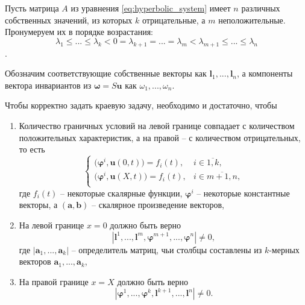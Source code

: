 \documentclass[../main.tex]{subfile}
\begin{document}
\begin{theorem}
	Пусть матрица $A$ из уравнения \eqref{eq:hyperbolic_system} имеет $n$
	различных собственных значений, из которых $k$ отрицательные, а $m$
	неположительные. Пронумеруем их в порядке возрастания:
	\[\lambda_1\le...\le\lambda_k<0=\lambda_{k+1}=...=\lambda_m<
	\lambda_{m+1}\le...\le\lambda_n\].

	Обозначим соответствующие собственные векторы как $\boldsymbol l_1,...,
	\boldsymbol l_n$,
	а компоненты вектора инвариантов из $\boldsymbol\omega=S\boldsymbol u$
	как $\omega_1,...,\omega_n$.

	Чтобы корректно задать краевую задачу, необходимо и достаточно, чтобы

	\begin{enumerate}[nosep]
		\item
			Количество граничных условий на левой границе совпадает с
			количеством положительных характеристик, а на правой --
			с количеством отрицательных, то есть
			\[
				\begin{cases}
					\big(\boldsymbol\varphi^i,
						\boldsymbol u(0,t)\big)=f_i(t),&
						i\in\overline{1,k}, \\
					\big(\boldsymbol\varphi^i,
						\boldsymbol u(X,t)\big)=f_i(t),&
						i\in\overline{m+1,n}, \\
				\end{cases}
			\]
			где $f_i(t)$ -- некоторые скалярные функции,
			$\boldsymbol\varphi^i$ -- некоторые константные векторы,
			а $(\boldsymbol a,\boldsymbol b)$ -- скалярное
			произведение векторов,
		\item
			На левой границе $x=0$ должно быть верно
			\[|\boldsymbol l^1,...,\boldsymbol l^m,
			\boldsymbol\varphi^{m+1},...,
			\boldsymbol\varphi^n|\ne 0,\]
			где $|\boldsymbol a_1,...,\boldsymbol a_k|$ --
			определитель матриц, чьи столбцы составлены из
			$k$-мерных векторов $\boldsymbol a_1,...,
			\boldsymbol a_k$,
		\item
			На правой границе $x=X$ должно быть верно
			\[|\boldsymbol\varphi^1,...,\boldsymbol\varphi^k,
			\boldsymbol l^{k+1},...,\boldsymbol l^n|\ne 0.\]
	\end{enumerate}
\end{theorem}
\end{document}
